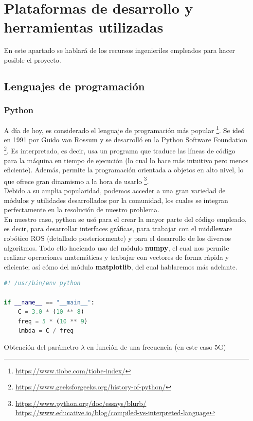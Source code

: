 \chapter{Plataformas de desarrollo y herramientas utilizadas}
\label{cap:capitulo3}

En este apartado se hablará de los recursos ingenieriles empleados para hacer posible el proyecto.

\section{Lenguajes de programación}
\label{sec:lenguajes_programacion}

\subsection{Python}
\label{subsec:python}

A día de hoy, es considerado el lenguaje de programación más popular \footnote[1]{\url{https://www.tiobe.com/tiobe-index/}}. Se ideó en 1991 por Guido van Rossum y se desarrolló en la Python Software Foundation \footnote[2]{\url{https://www.geeksforgeeks.org/history-of-python/}}. Es interpretado, es decir, usa un programa que traduce las líneas de código para la máquina en tiempo de ejecución (lo cual lo hace más intuitivo pero menos eficiente). Además, permite la programación orientada a objetos en alto nivel, lo que ofrece gran dinamismo a la hora de usarlo \footnote[3]{\url{https://www.python.org/doc/essays/blurb/} \url{https://www.educative.io/blog/compiled-vs-interpreted-language}}.\\

Debido a su amplia popularidad, podemos acceder a una gran variedad de módulos y utilidades desarrollados por la comunidad, los cuales se integran perfectamente en la resolución de nuestro problema.\\

En nuestro caso, python se usó para el crear la mayor parte del código empleado, es decir, para desarrollar interfaces gráficas, para trabajar con el middleware robótico \ac{ROS} (detallado posteriormente) y para el desarrollo de los diversos algoritmos. Todo ello haciendo uso del módulo \textbf{numpy}, el cual nos permite realizar operaciones matemáticas y trabajar con vectores de forma rápida y eficiente; así cómo del módulo \textbf{matplotlib}, del cual hablaremos más adelante.\\

\begin{code}[H]
\begin{lstlisting}[language=Python]
#! /usr/bin/env python

if __name__ == "__main__":
	C = 3.0 * (10 ** 8)
	freq = 5 * (10 ** 9)
	lmbda = C / freq
\end{lstlisting}
\caption[Obtención del parámetro lambda en función de una frecuencia (en este caso 5G)]{Obtención del parámetro $\lambda$ en función de una frecuencia (en este caso 5G)}
\label{cod:helloworld_python}
\end{code}

